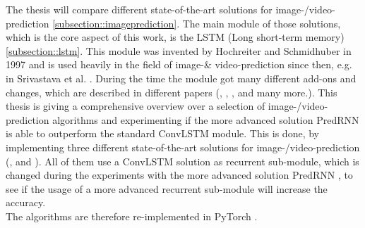 The thesis will compare different state-of-the-art solutions for image-/video-prediction \ref{subsection::imageprediction}.
The main module of those solutions, which is the core aspect of this work, is the LSTM (Long short-term memory) \ref{subsection::lstm}.
This module was invented by Hochreiter and Schmidhuber  \cite{Hochreiter1997} in 1997 and is used heavily in the field of image-\& video-prediction since then, e.g. in Srivastava et al. 
\cite{Srivastava2015}.
During the time the module got many different add-ons and changes, which are described in different papers (\cite{Patraucean2015}, \cite{Lotter2016}, \cite{Wang2017}, \cite{Wang2018} and many 
more.). 
This thesis is giving a comprehensive overview over a selection of image-/video-prediction algorithms and experimenting if the more advanced solution PredRNN \cite{Wang2017} is able to outperform the standard ConvLSTM module. This is done, by implementing
three different state-of-the-art solutions for image-/video-prediction (\cite{Shi2015}, \cite{Patraucean2015} and \cite{Lotter2016}).
All of them use a ConvLSTM solution as recurrent sub-module, which is changed during the experiments
with the more advanced solution PredRNN \cite{Wang2017}, to see if the usage of a more advanced recurrent sub-module will increase the accuracy.\\
The algorithms are therefore re-implemented in PyTorch \cite{Paszke2019}.